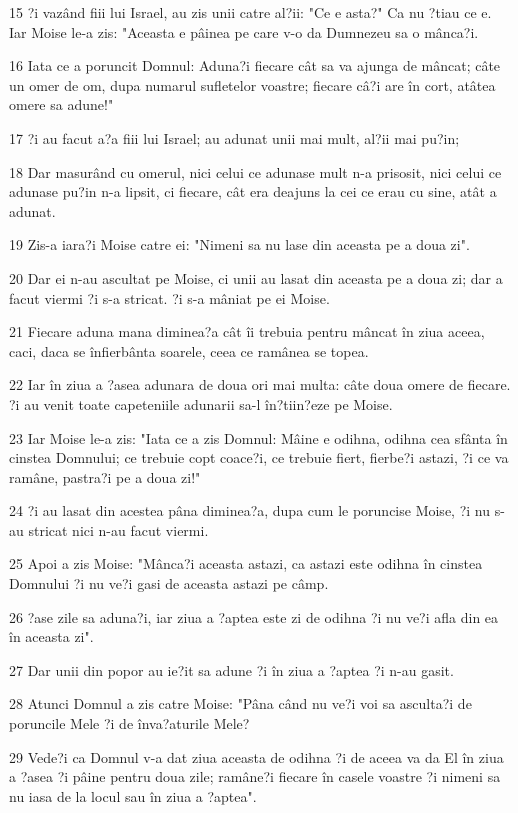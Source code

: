 \par 15 ?i vazând fiii lui Israel, au zis unii catre al?ii: "Ce e asta?" Ca nu ?tiau ce e. Iar Moise le-a zis: "Aceasta e pâinea pe care v-o da Dumnezeu sa o mânca?i.
\par 16 Iata ce a poruncit Domnul: Aduna?i fiecare cât sa va ajunga de mâncat; câte un omer de om, dupa numarul sufletelor voastre; fiecare câ?i are în cort, atâtea omere sa adune!"
\par 17 ?i au facut a?a fiii lui Israel; au adunat unii mai mult, al?ii mai pu?in;
\par 18 Dar masurând cu omerul, nici celui ce adunase mult n-a prisosit, nici celui ce adunase pu?in n-a lipsit, ci fiecare, cât era deajuns la cei ce erau cu sine, atât a adunat.
\par 19 Zis-a iara?i Moise catre ei: "Nimeni sa nu lase din aceasta pe a doua zi".
\par 20 Dar ei n-au ascultat pe Moise, ci unii au lasat din aceasta pe a doua zi; dar a facut viermi ?i s-a stricat. ?i s-a mâniat pe ei Moise.
\par 21 Fiecare aduna mana diminea?a cât îi trebuia pentru mâncat în ziua aceea, caci, daca se înfierbânta soarele, ceea ce ramânea se topea.
\par 22 Iar în ziua a ?asea adunara de doua ori mai multa: câte doua omere de fiecare. ?i au venit toate capeteniile adunarii sa-l în?tiin?eze pe Moise.
\par 23 Iar Moise le-a zis: "Iata ce a zis Domnul: Mâine e odihna, odihna cea sfânta în cinstea Domnului; ce trebuie copt coace?i, ce trebuie fiert, fierbe?i astazi, ?i ce va ramâne, pastra?i pe a doua zi!"
\par 24 ?i au lasat din acestea pâna diminea?a, dupa cum le poruncise Moise, ?i nu s-au stricat nici n-au facut viermi.
\par 25 Apoi a zis Moise: "Mânca?i aceasta astazi, ca astazi este odihna în cinstea Domnului ?i nu ve?i gasi de aceasta astazi pe câmp.
\par 26 ?ase zile sa aduna?i, iar ziua a ?aptea este zi de odihna ?i nu ve?i afla din ea în aceasta zi".
\par 27 Dar unii din popor au ie?it sa adune ?i în ziua a ?aptea ?i n-au gasit.
\par 28 Atunci Domnul a zis catre Moise: "Pâna când nu ve?i voi sa asculta?i de poruncile Mele ?i de înva?aturile Mele?
\par 29 Vede?i ca Domnul v-a dat ziua aceasta de odihna ?i de aceea va da El în ziua a ?asea ?i pâine pentru doua zile; ramâne?i fiecare în casele voastre ?i nimeni sa nu iasa de la locul sau în ziua a ?aptea".
